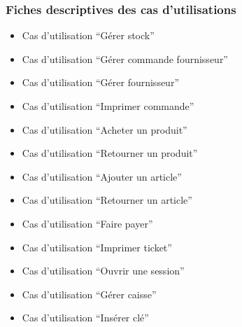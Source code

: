 \documentclass[a4paper,table]{article}
\begin{document}
\subsubsection{Fiches descriptives des cas d'utilisations}
\begin{itemize}[font=\color{magenta} \Large, label=]
\item Cas d'utilisation ``Gérer stock''

\newpage

\item Cas d'utilisation ``Gérer commande fournisseur''

\newpage

\item Cas d'utilisation ``Gérer fournisseur''

\newpage

\item Cas d'utilisation ``Imprimer commande''

\newpage

\item Cas d'utilisation ``Acheter un produit''

\newpage

\item Cas d'utilisation ``Retourner un produit''

\newpage

\item Cas d'utilisation ``Ajouter un article''

\newpage

\item Cas d'utilisation ``Retourner un article''

\newpage

\item Cas d'utilisation ``Faire payer''

\newpage

\item Cas d'utilisation ``Imprimer ticket''

\newpage

\item Cas d'utilisation ``Ouvrir une session''

\newpage

\item Cas d'utilisation ``Gérer caisse''

\newpage

\item Cas d'utilisation ``Insérer clé''

\newpage
\end{itemize}
\end{document}
